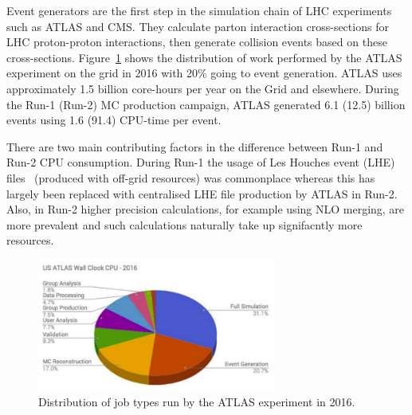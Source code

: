 \documentclass{article}
\begin{document}
Event generators are the first step in the simulation chain of LHC experiments such as ATLAS and CMS. They calculate parton interaction cross-sections for LHC proton-proton interactions, then generate collision events based on these cross-sections. 
Figure~\ref{fig:atlas_grid_jobs_2016} shows the distribution of work performed by the ATLAS experiment on the grid in 2016 with 20\% going to event generation. ATLAS uses approximately 1.5 billion core-hours per year on the Grid and elsewhere. During the Run-1 (Run-2) MC production campaign, ATLAS generated 6.1 (12.5) billion events using 1.6 (91.4) CPU-time per event. 

There are two main contributing factors in the difference between Run-1 and Run-2 CPU consumption. During Run-1 the usage of Les Houches event (LHE) files~\cite{Alwall:2006yp,Andersen:2014efa} (produced with off-grid resources) was commonplace whereas this has largely been replaced with centralised LHE file production by ATLAS in Run-2. Also, in Run-2 higher precision calculations, for example using NLO merging, are more prevalent and such calculations naturally take up signifacntly more resources.


\begin{figure}
\centering
\includegraphics[width=0.7\textwidth]{atlas_grid_usage_2016}
\caption{Distribution of job types run by the ATLAS experiment in 2016.}
\label{fig:atlas_grid_jobs_2016}
\end{figure}


\end{document}
